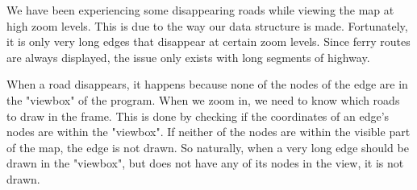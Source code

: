 We have been experiencing some disappearing roads while viewing the map at high zoom levels. This is due to the way our data structure is made. Fortunately, it is only very long edges that disappear at certain zoom levels. Since ferry routes are always displayed, the issue only exists with long segments of highway.

When a road disappears, it happens because none of the nodes of the edge are in the "viewbox" of the program. When we zoom in, we need to know which roads to draw in the frame. This is done by checking if the coordinates of an edge's nodes are within the "viewbox". If neither of the nodes are within the visible part of the map, the edge is not drawn. So naturally, when a very long edge should be drawn in the "viewbox", but does not have any of its nodes in the view, it is not drawn. 
